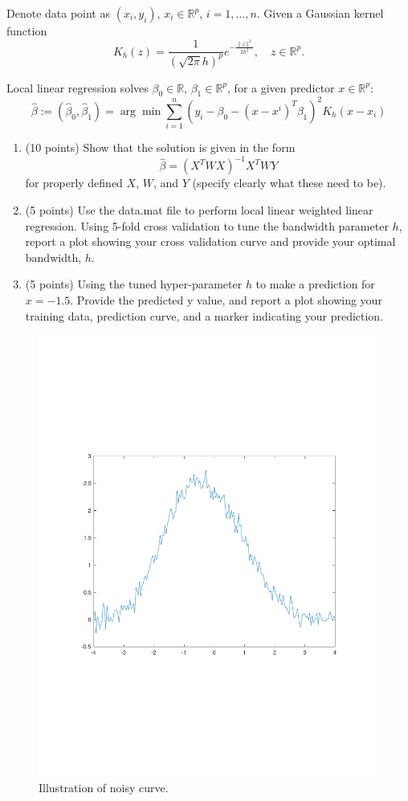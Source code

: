 \documentclass[twoside,10pt]{article}
\begin{document}
\begin{enumerate}[label*=\arabic*.]
Denote data point as $(x_i, y_i)$, $x_i \in \mathbb R^p$,  $i = 1, \ldots, n$. Given a Gaussian kernel function 
\[K_h(z) = \frac{1}{(\sqrt{2\pi}h)^p} e^{-\frac{\|z\|^2}{2h^2}}, \quad z \in \mathbb R^p.\]

Local linear regression solves $\beta_0\in \mathbb R$, $\beta_1 \in \mathbb R^p$, for a given predictor $x \in \mathbb R^p$:
\[
\widehat \beta:= (\widehat \beta_0, \widehat\beta_1) = \arg\min \sum_{i=1}^n (y_i - \beta_0 -(x-x^i)^T \beta_1)^2 K_h(x- x_i)
\]

\begin{enumerate}[label*=\arabic*.]
\item (10 points) Show that the solution is given in the form
\[
\widehat \beta = (X^T  W X)^{-1} X^T W Y
\]
for properly defined $X$, $W$, and $Y$ (specify clearly what these need to be).

\item (5 points) Use the data.mat file to perform local linear weighted linear regression. Using 5-fold cross validation to tune the bandwidth parameter $h$, report a plot showing your cross validation curve and provide your optimal bandwidth, $h$. 

\item  (5 points) Using the tuned hyper-parameter $h$ to make a prediction for $x = -1.5$. Provide the predicted y value, and report a plot showing your training data, prediction curve, and a marker indicating your prediction.
\end{enumerate}


 

\end{enumerate}


\begin{figure}[h!]
\begin{center}
\includegraphics[width =.5 \textwidth]{noisy_curve.pdf}
\end{center}
\caption{Illustration of  noisy curve.}
\end{figure}
\end{document}
